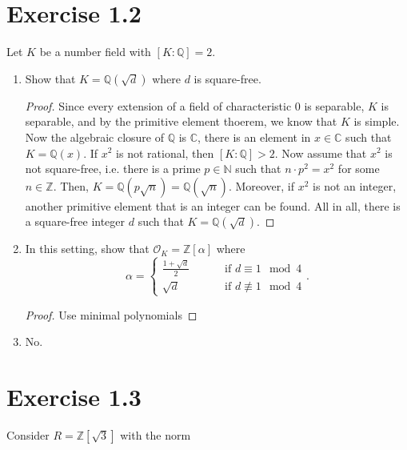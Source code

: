 \documentclass[a4paper]{article}
\begin{document}
\section*{Exercise 1.2}
Let \(K\) be a number field with \([K:\mathbb{Q}] = 2\).
\begin{enumerate}
  \item Show that \(K = \mathbb{Q}(\sqrt{d})\) where \(d\) is square-free.
  \begin{proof}
    Since every extension of a field of characteristic \(0\) is separable, \(K\) is separable, and by the primitive element thoerem, we know that \(K\) is simple. Now the algebraic closure of \(\mathbb{Q}\) is \(\mathbb{C}\), there is an element in \(x \in \mathbb{C}\) such that \(K = \mathbb{Q}(x)\). If \(x^2\) is not rational, then \([K : \mathbb{Q}] > 2\). Now assume that \(x^2\) is not square-free, i.e. there is a prime \(p \in \mathbb{N}\) such that \(n \cdot p^2 = x^2\) for some \(n \in \mathbb{Z}\). Then, \(K = \mathbb{Q}(p \sqrt{n}) = \mathbb{Q}(\sqrt{n})\). Moreover, if \(x^2\) is not an integer, another primitive element that is an integer can be found. All in all, there is a square-free integer \(d\) such that \(K = \mathbb{Q}(\sqrt{d})\).
  \end{proof}
  \item In this setting, show that \(\mathcal{O}_K = \mathbb{Z}[\alpha]\) where
  \begin{equation}
    \alpha = \begin{cases}
      \frac{1+\sqrt{d}}{2} &\qquad \text{ if } d \equiv 1 \mod{4}\\
      \sqrt{d} &\qquad \text{ if } d \not\equiv 1 \mod{4}
    \end{cases} \text{.}
  \end{equation}
  \begin{proof}
    Use minimal polynomials
  \end{proof}
  \item No.
\end{enumerate}
\section*{Exercise 1.3}
Consider \(R = \mathbb{Z}[\sqrt{3}]\) with the norm 
\end{document}
